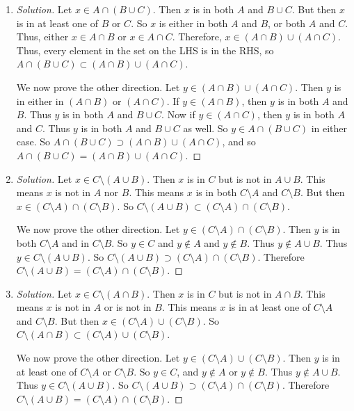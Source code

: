 \documentclass{article}
\begin{document}
\begin{enumerate}
\item \begin{proof}[Solution]\let\qed\relax
	Let $x \in A \cap (B \cup C)$.
	Then $x$ is in both $A$ and $B \cup C$.
	But then $x$ is in at least one of $B$ or $C$.
	So $x$ is either in both $A$ and $B$,
	or both $A$ and $C$.
	Thus, either $x\in A \cap B$ or $x\in A\cap C$.
	Therefore, $x \in (A \cap B) \cup (A \cap C)$.
	Thus, every element in the set on the LHS is in the RHS,
	so $A \cap (B \cup C) \subset (A \cap B) \cup (A \cap C)$.

	We now prove the other direction.
	Let $y \in (A \cap B) \cup (A \cap C)$.
	Then $y$ is in either in $(A \cap B)$ or $(A \cap C)$.
	If $y \in (A \cap B)$, then $y$ is in both $A$ and $B$.
	Thus $y$ is in both $A$ and $B \cup C$.
	Now if $y \in (A \cap C)$, then $y$ is in both $A$ and $C$.
	Thus $y$ is in both $A$ and $B \cup C$ as well.
	So $y \in A \cap (B \cup C)$ in either case.
	So $A \cap (B \cup C) \supset (A \cap B) \cup (A \cap C)$,
	and so $A \cap (B \cup C) = (A \cap B) \cup (A \cap C)$.
\end{proof}
\item \begin{proof}[Solution]\let\qed\relax
	Let $x \in C \setminus (A \cup B)$.
	Then $x$ is in $C$ but is not in $A \cup B$.
	This means $x$ is not in $A$ nor $B$.
	This means $x$ is in both $C \setminus A$ and $C \setminus B$.
	But then $x \in (C \setminus A) \cap (C \setminus B)$.
	So $C \setminus (A \cup B) \subset (C \setminus A) \cap (C \setminus B)$.

	We now prove the other direction.
	Let $y \in (C \setminus A) \cap (C \setminus B)$.
	Then $y$ is in both $C \setminus A$ and in $C \setminus B$.
	So $y \in C$ and $y \not\in A$ and $y\not\in B$.
	Thus $y \not\in A \cup B$.
	Thus $y \in C \setminus (A\cup B)$.
	So $C \setminus (A \cup B) \supset (C \setminus A) \cap (C \setminus B)$.
	Therefore $C \setminus (A \cup B) = (C \setminus A) \cap (C \setminus B)$.
\end{proof}
\item \begin{proof}[Solution]\let\qed\relax
	Let $x \in C \setminus (A \cap B)$.
	Then $x$ is in $C$ but is not in $A \cap B$.
	This means $x$ is not in $A$ or is not in $B$.
	This means $x$ is in at least one of $C \setminus A$ and $C \setminus B$.
	But then $x \in (C \setminus A) \cup (C \setminus B)$.
	So $C \setminus (A \cap B) \subset (C \setminus A) \cup (C \setminus B)$.

	We now prove the other direction.
	Let $y \in (C \setminus A) \cup (C \setminus B)$.
	Then $y$ is in at least one of $C \setminus A$ or $C \setminus B$.
	So $y \in C$, and $y \not\in A$ or $y\not\in B$.
	Thus $y \not\in A \cup B$.
	Thus $y \in C \setminus (A\cup B)$.
	So $C \setminus (A \cup B) \supset (C \setminus A) \cap (C \setminus B)$.
	Therefore $C \setminus (A \cup B) = (C \setminus A) \cap (C \setminus B)$.
\end{proof}

\end{enumerate}
\clearpage
\end{document}
